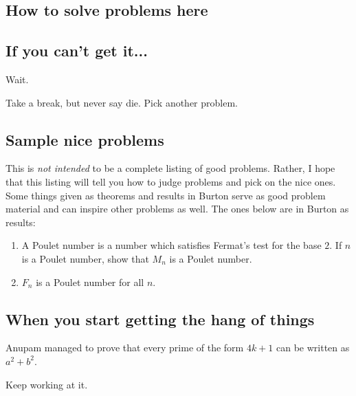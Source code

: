 \documentclass[a4paper]{amsart}
\begin{document}
\subsection{How to solve problems here}


\subsection{If you can't get it...}

Wait.

Take a break, but never say die. Pick another problem.

\subsection{Sample nice problems}

This is {\em not intended} to be a complete listing of good problems. Rather, I hope that this listing will tell
you how to judge problems and pick on the nice ones. 
Some things given as theorems and results in Burton serve as good problem material and can inspire other problems as well.
The ones below are in Burton as results:

\begin{enumerate}
\item A Poulet number is a number which satisfies Fermat's test for the base $2$. 
  If $n$ is a Poulet number, show that $M_n$ is a Poulet number.

\item $F_n$ is a Poulet number for all $n$.

\end{enumerate}




\subsection{When you start getting the hang of things}

Anupam managed to prove that every prime of the form $4k+1$ can be written as $a^2 + b^2$. %

Keep working at it.
\end{document}
